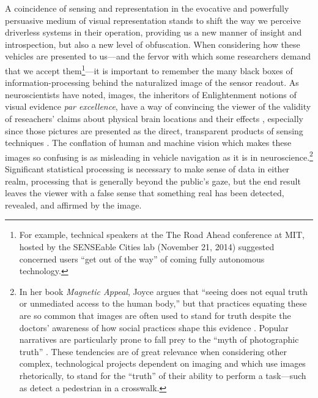 
A coincidence of sensing and representation in the evocative and
powerfully persuasive medium of visual representation stands to shift
the way we perceive driverless systems in their operation, providing
us a new manner of insight and introspection, but also
a new level of obfuscation. When
considering how these vehicles are presented to us---and the fervor with
which some researchers demand that we accept them\footnote{For
  example, technical speakers at the The Road Ahead conference at MIT,
hosted by the SENSEable Cities lab (November 21, 2014) suggested
concerned users ``get out of the way'' of coming fully autonomous
technology.}---it is important to 
remember the many black boxes of information-processing behind the
naturalized image of the sensor readout. As neuroscientists have
noted, images, the inheritors of Enlightenment notions of
visual evidence \emph{par excellence}, have a way of convincing the viewer of
the validity of reseachers' claims about physical brain locations and
their effects \cite{lehrerNeuro}, especially since those pictures are presented as the
direct, transparent products of sensing techniques \cite[p.
  76]{kellyMagnetic}. The conflation of 
human and machine vision which makes these images so confusing is as
misleading in vehicle navigation as it is in neuroscience.\footnote{In
her book \emph{Magnetic Appeal}, Joyce argues that ``seeing does not
equal truth or unmediated access to the human body,'' but that
practices equating these are so common that images are often used to
stand for truth despite the doctors' awareness of how social practices
shape this evidence
\cite[p. 76]{kellyMagnetic}. Popular narratives are particularly prone
to fall
prey to the ``myth of photographic truth'' \cite[p.
  75]{kellyMagnetic}. These tendencies are of great relevance
when considering other complex, technological projects dependent on
imaging and which use images rhetorically, to stand for the ``truth''
of their ability to perform a task---such as detect a pedestrian in a
crosswalk.} Significant 
statistical processing is necessary to make sense of data in either
realm, processing that is generally beyond the public's gaze, but the 
end result leaves the viewer with a false sense that something real
has been detected, revealed, and affirmed by the image.


